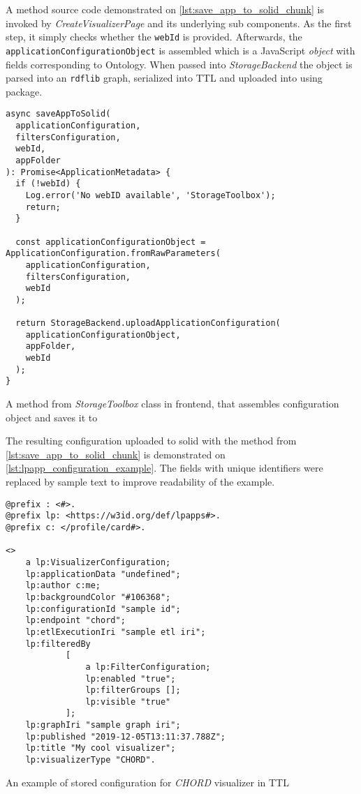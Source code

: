 A method source code demonstrated on \autoref{lst:save_app_to_solid_chunk} is invoked by \textit{CreateVisualizerPage} and its underlying sub components. As the first step, it simply checks whether the \texttt{webId} is provided. Afterwards, the \texttt{application\-Configuration\-Object} is assembled which is a JavaScript \textit{object} with fields corresponding to \lpas{} Ontology. When passed into \textit{StorageBackend} the object is parsed into an \texttt{rdflib} graph, serialized into TTL and uploaded into \solid{} using \lpas{} package.

\begin{listing}[H]    
\begin{verbatim}
async saveAppToSolid(
  applicationConfiguration,
  filtersConfiguration,
  webId,
  appFolder
): Promise<ApplicationMetadata> {
  if (!webId) {
    Log.error('No webID available', 'StorageToolbox');
    return;
  }

  const applicationConfigurationObject = ApplicationConfiguration.fromRawParameters(
    applicationConfiguration,
    filtersConfiguration,
    webId
  );

  return StorageBackend.uploadApplicationConfiguration(
    applicationConfigurationObject,
    appFolder,
    webId
  );
}
\end{verbatim}
\caption{A method from \textit{StorageToolbox} class in\lpa{} frontend, that assembles configuration object and saves it to \solid{}} 
\label{lst:save_app_to_solid_chunk}
\end{listing}

The resulting \lpa{} configuration uploaded to solid with the method from \autoref{lst:save_app_to_solid_chunk} is demonstrated on \autoref{lst:lpapp_configuration_example}. The fields with unique identifiers were replaced by sample text to improve readability of the example. 

\begin{listing}[H]    
\begin{verbatim}
@prefix : <#>.
@prefix lp: <https://w3id.org/def/lpapps#>.
@prefix c: </profile/card#>.

<>
    a lp:VisualizerConfiguration;
    lp:applicationData "undefined";
    lp:author c:me;
    lp:backgroundColor "#106368";
    lp:configurationId "sample id";
    lp:endpoint "chord";
    lp:etlExecutionIri "sample etl iri";
    lp:filteredBy
            [
                a lp:FilterConfiguration;
                lp:enabled "true";
                lp:filterGroups [];
                lp:visible "true"
            ];
    lp:graphIri "sample graph iri";
    lp:published "2019-12-05T13:11:37.788Z";
    lp:title "My cool visualizer";
    lp:visualizerType "CHORD".
\end{verbatim}
\caption{An example of stored \lpa{} configuration for \textit{CHORD} visualizer in TTL} 
\label{lst:lpapp_configuration_example}
\end{listing}

